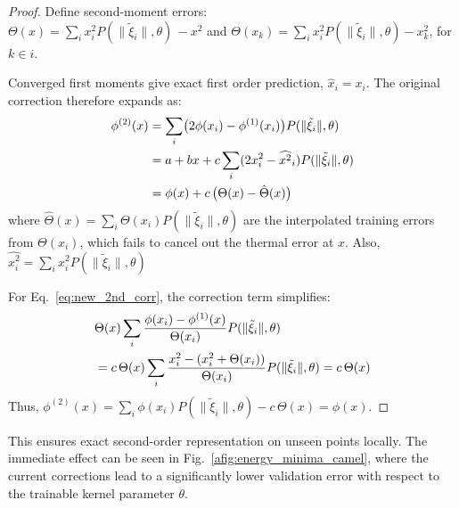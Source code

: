 \documentclass{article} %
\theoremstyle{plain}
\begin{document}
\begin{proof}
Define second-moment errors:\\
$\Theta(x) = \sum_i x_i^2 P(\|\tilde{\xi}_i\|,\theta) \, - x^2$ and $\Theta(x_k) =  \sum_i x_i^2 P(\|\tilde{\xi}_i\|,\theta) - x_k^2$, for $k\in i$. 

Converged first moments give exact first order prediction, $\hat{x}_i = x_i$. The original correction therefore expands as:
\begin{align}
\phi^{(2)}(x) &= \sum_i \bigl(2\phi(x_i) - \phi^{(1)}(x_i)\bigr) P(\|\tilde{\xi}_i\|,\theta) \notag \\
&= a + bx + c\sum_i (2x_i^2 - \widehat{x^2}_i) P(\|\tilde{\xi}_i\|,\theta) \notag\\
&= \phi(x) + c\,\bigl(\Theta(x) - \hat{\Theta}(x)\bigr)
\end{align}
where $\hat{\Theta}(x) = \sum_i \Theta(x_i) P(\|\tilde{\xi}_i\|,\theta)$ are the interpolated training errors from $\Theta(x_i)$, which fails to cancel out the thermal error at $x$. Also, $\widehat{x^2_i} = \sum_i x_i^2 P(\|\tilde{\xi}_i\|,\theta) $

For Eq.~\ref{eq:new_2nd_corr}, the correction term simplifies:
\begin{align}
&\Theta(x) \sum_i \frac{\phi(x_i)-\phi^{(1)}(x)}{\Theta(x_i)} P(\|\tilde{\xi}_i\|,\theta) \notag\\
&= c\,\Theta(x) \sum_i \frac{x_i^2 - (x_i^2 + \Theta(x_i))}{\Theta(x_i)} P(\|\tilde{\xi}_i\|,\theta) = c\,\Theta(x)
\end{align}
Thus, $\phi^{(2)}(x) = \sum_i \phi(x_i) P(\|\tilde{\xi}_i\|,\theta) - c \, \Theta(x) = \phi(x)$.
\end{proof}

This ensures exact second-order representation on unseen points locally. The immediate effect can be seen in Fig.~\ref{afig:energy_minima_camel}, where the current corrections lead to a significantly lower validation error with respect to the trainable kernel parameter $\theta$.
\end{document}
